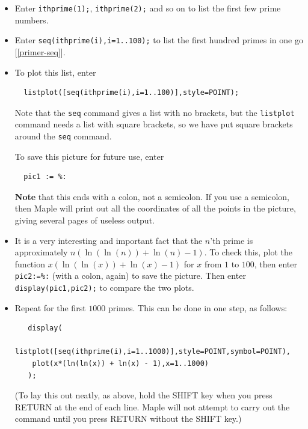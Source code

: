 \documentclass[a4paper,10pt]{amsbook}
\begin{document}
\begin{exercise}\label{ex-plotprimes}
 \begin{itemize}
  \item[(a)] Enter \verb~ithprime(1);~, \verb~ithprime(2);~ and so on
   to list the first few prime numbers. 
  \item[(b)] Enter \verb~seq(ithprime(i),i=1..100);~ to list the first
   hundred primes in one go [\ref{primer-seq}]. 
  \item[(c)] To plot this list, enter 
\begin{verbatim}
  listplot([seq(ithprime(i),i=1..100)],style=POINT);
\end{verbatim}
   Note that the \verb~seq~ command gives a list with no
   brackets, but the \verb~listplot~ command needs a list
   with square brackets, so we have put square brackets
   around the \verb~seq~ command.

   To save this picture for future use, enter 
\begin{verbatim}
  pic1 := %:
\end{verbatim}
   \textbf{Note} that this ends with a colon, not a semicolon.  If you
   use a semicolon, then Maple will print out all the coordinates of
   all the points in the picture, giving several pages of useless
   output.  
 \item[(d)] It is a very interesting and important fact that the $n$'th
  prime is approximately $n(\ln(\ln(n))+\ln(n)-1)$.  To check this,
  plot the function $x(\ln(\ln(x))+\ln(x)-1)$ for $x$ from $1$ to
  $100$, then enter \verb~pic2:=%:~
  (with a colon, again) to save the picture.  Then enter
  \verb~display(pic1,pic2);~ to compare the two plots. 
 \item[(e)] Repeat for the first $1000$ primes.  This can be done in
  one step, as follows:
\begin{verbatim}
   display(
    listplot([seq(ithprime(i),i=1..1000)],style=POINT,symbol=POINT),
    plot(x*(ln(ln(x)) + ln(x) - 1),x=1..1000)
   );
\end{verbatim}
  (To lay this out neatly, as above, hold the SHIFT key when you press
  RETURN at the end of each line.  Maple will not attempt to carry out
  the command until you press RETURN without the SHIFT key.) 
 \end{itemize}
\end{exercise}
\end{document}

